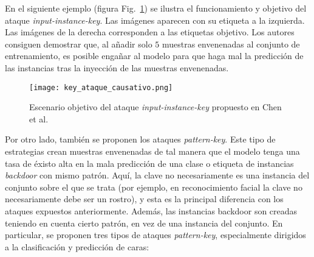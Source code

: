 En el siguiente ejemplo (figura Fig.~\ref{fig:backdoor1}) se ilustra el funcionamiento y objetivo del ataque \textit{input-instance-key}. Las imágenes aparecen con su etiqueta a la izquierda. Las imágenes de la derecha corresponden a las etiquetas objetivo. Los autores consiguen demostrar que, al añadir solo $5$ muestras envenenadas al conjunto de entrenamiento, es posible engañar al modelo para que haga mal la predicción de las instancias tras la inyección de las muestras envenenadas.

\begin{figure}[h]
    \centering
    \texttt{[image: key\_ataque\_causativo.png]}
    \caption{Escenario objetivo del ataque \textit{input-instance-key} propuesto en Chen et al.~\cite{Backdoor}}
    \label{fig:backdoor1}
\end{figure}


Por otro lado, también se proponen los ataques \textit{pattern-key}. Este tipo de estrategias crean muestras envenenadas de tal manera que el modelo tenga una tasa de éxisto alta en la mala predicción de una clase o etiqueta de instancias \textit{backdoor} con mismo patrón. Aquí, la clave no necesariamente es una instancia del conjunto sobre el que se trata (por ejemplo, en reconocimiento facial la clave no necesariamente debe ser un rostro), y esta es la principal diferencia con los ataques expuestos anteriormente. Además, las instancias backdoor son creadas teniendo en cuenta cierto patrón, en vez de una instancia del conjunto. En particular, se proponen tres tipos de ataques \textit{pattern-key}, especialmente dirigidos a la clasificación y predicción de caras:

